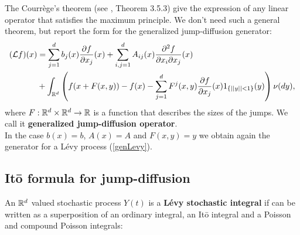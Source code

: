The Courrège's theorem (see \cite{Applebaum}, Theorem 3.5.3) give the expression of any linear operator that
satisfies the maximum principle. We don't need such a general theorem, but report the form for the generalized jump-diffusion generator:
\begin{align} \label{gen_jumpdiff}
  (\mathcal{L} f)(x) &= \sum_{j=1}^{d} b_j(x) \frac{\partial f}{\partial x_j}(x) +
  \sum_{i,j=1}^{d} A_{ij}(x) \frac{\partial^2 f}{\partial x_i \partial x_j}(x)\\  
           & + \int_{\mathbb{R}^d} \left( f(x+F(x,y)) - f(x) - \sum_{j=1}^{d} F^j(x,y) \frac{\partial f}{\partial x_j}(x) 
           1_{\{ ||y||<1 \}}(y) \right) \nu(dy),   \nonumber
  \end{align} 
where $F:\mathbb{R}^d \times \mathbb{R}^d \to \mathbb{R} $ is a function that describes the sizes of the jumps.
We call it \textbf{generalized jump-diffusion operator}.\\

In the case $b(x)=b$, $A(x)=A$ and $F(x,y)=y$ we obtain again the generator for a Lévy process (\ref{genLevy}). 
  
  
\subsection{It\={o} formula for jump-diffusion}

An $\mathbb{R}^d$ valued stochastic process $Y(t)$ is a \textbf{Lévy stochastic integral} if can be written as a superposition of
an ordinary integral, an It\={o} integral and a Poisson and compound Poisson integrals:

